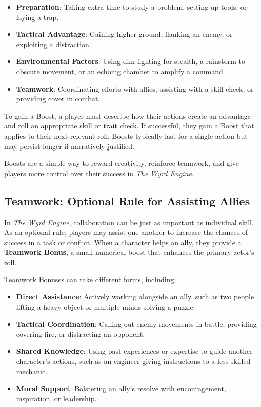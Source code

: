 \begin{itemize}
    \item \textbf{Preparation}: Taking extra time to study a problem, setting up tools, or laying a trap.  
    \item \textbf{Tactical Advantage}: Gaining higher ground, flanking an enemy, or exploiting a distraction.  
    \item \textbf{Environmental Factors}: Using dim lighting for stealth, a rainstorm to obscure movement, or an echoing chamber to amplify a command.  
    \item \textbf{Teamwork}: Coordinating efforts with allies, assisting with a skill check, or providing cover in combat.  
\end{itemize}

To gain a Boost, a player must describe how their actions create an advantage and roll an appropriate skill or trait check. If successful, they gain a Boost that applies to their next relevant roll. Boosts typically last for a single action but may persist longer if narratively justified.  

Boosts are a simple way to reward creativity, reinforce teamwork, and give players more control over their success in \textit{The Wyrd Engine}.


\subsection{Teamwork: Optional Rule for Assisting Allies}

In \textit{The Wyrd Engine}, collaboration can be just as important as individual skill. As an optional rule, players may assist one another to increase the chances of success in a task or conflict. When a character helps an ally, they provide a \textbf{Teamwork Bonus}, a small numerical boost that enhances the primary actor’s roll.  

Teamwork Bonuses can take different forms, including:  

\begin{itemize}
    \item \textbf{Direct Assistance}: Actively working alongside an ally, such as two people lifting a heavy object or multiple minds solving a puzzle.  
    \item \textbf{Tactical Coordination}: Calling out enemy movements in battle, providing covering fire, or distracting an opponent.  
    \item \textbf{Shared Knowledge}: Using past experiences or expertise to guide another character’s actions, such as an engineer giving instructions to a less skilled mechanic.  
    \item \textbf{Moral Support}: Bolstering an ally’s resolve with encouragement, inspiration, or leadership.  
\end{itemize}

